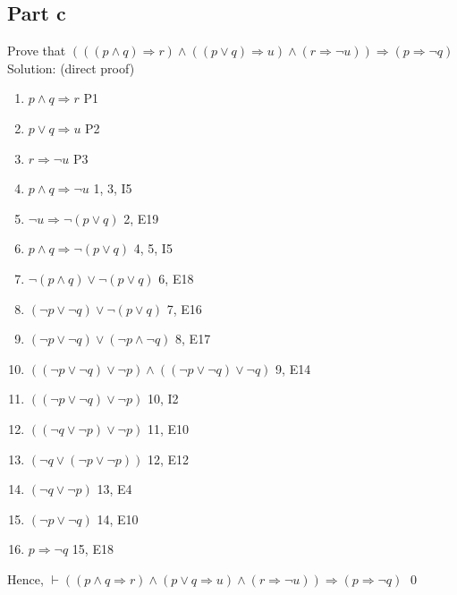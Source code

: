 \documentclass{article}
\begin{document}
		\subsection{Part c}
			Prove that $(((p \land q) \Rightarrow r) \land ((p \lor q) \Rightarrow u) \land (r \Rightarrow \lnot u)) \Rightarrow (p \Rightarrow \lnot q)$ \\
			Solution: (direct proof) \\
			\begin{enumerate}
				\item $p \land q \Rightarrow r$ \hfill P1 
				\item $p \lor q \Rightarrow u$  \hfill P2 
				\item $r \Rightarrow \lnot u$    \hfill P3 
				\item $p \land q \Rightarrow \lnot u$ \hfill 1, 3, I5 
				\item $\lnot u \Rightarrow \lnot(p \lor q)$ \hfill 2, E19 
				\item $p \land q \Rightarrow \lnot(p \lor q)$ \hfill 4, 5, I5 
				\item $\lnot(p \land q) \lor \lnot(p \lor q)$ \hfill 6, E18 
				\item $(\lnot p \lor \lnot q) \lor \lnot(p \lor q)$ \hfill 7, E16 
				\item $(\lnot p \lor \lnot q) \lor (\lnot p \land \lnot q)$ \hfill 8, E17 
				\item $((\lnot p \lor \lnot q) \lor \lnot p) \land ((\lnot p \lor \lnot q) \lor \lnot q)$ \hfill 9, E14 
				\item $((\lnot p \lor \lnot q) \lor \lnot p)$ \hfill 10, I2 
				\item $((\lnot q \lor \lnot p) \lor \lnot p)$ \hfill 11, E10 
				\item $(\lnot q \lor (\lnot p \lor \lnot p))$ \hfill 12, E12 
				\item $(\lnot q \lor \lnot p)$ \hfill 13, E4 
				\item $(\lnot p \lor \lnot q)$ \hfill 14, E10 
				\item $p \Rightarrow \lnot q$ \hfill 15, E18 
			\end{enumerate}
			Hence, $\vdash$$((p \land q \Rightarrow r) \land (p \lor q \Rightarrow u) \land (r \Rightarrow \lnot u)) \Rightarrow (p \Rightarrow \lnot q)$ \hfill \qed
\end{document}
